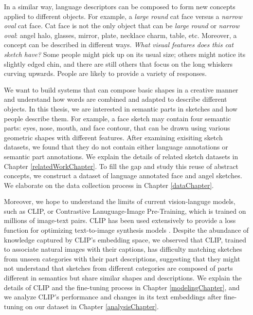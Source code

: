 In a similar way, language descriptors can be composed to form new concepts applied to different objects. For example, a \textit{large round} cat face versus a \textit{narrow oval} cat face. 
Cat face is not the only object that can be \textit{large round} or \textit{narrow oval}: angel halo, glasses, mirror, plate, necklace charm, table, etc.
Moreover, a concept can be described in different ways. \textit{What visual features does this cat sketch have?} Some people might pick up on its usual size; others might notice its slightly edged chin, and there are still others that focus on the long whiskers curving upwards. People are likely to provide a variety of responses.  

We want to build systems that can compose basic shapes in a creative manner and understand how words are combined and adapted to describe different objects.  
In this thesis, we are interested in semantic parts in sketches and how people describe them. For example, a face sketch may contain four semantic parts: eyes, nose, mouth, and face contour, that can be drawn using various geometric shapes with different features. After examining exisiting sketch datasets, we found that they do not contain either language annotations or semantic part annotations. We explain the details of related sketch datasets in Chapter \ref{relatedWorkChapter}. To fill the gap and study this reuse of abstract concepts, we construct a dataset of language annotated face and angel sketches. We elaborate on the data collection process in Chapter \ref{dataChapter}.  

Moreover, we hope to understand the limits of current vision-languge models, such as CLIP, or Contrastive Lanuguage-Image Pre-Training, which is trained on millions of image-text pairs. CLIP has been used extensively to provide a loss function for optimizing text-to-image synthesis models \citep{clipDrawPaper,dalle2Paper,styleganNadaPaper,styleCLIPPaper}. Despite the abundance of knowledge captured by CLIP's embedding space, we observed that CLIP, trained to associate natural images with their captions, has difficulty matching sketches from unseen categories with their part descriptions, suggesting that they might not understand that sketches from different categories are composed of parts different in semantics but share similar shapes and descriptions. We explain the details of CLIP and the fine-tuning process in Chapter \ref{modelingChapter}, and we analyze CLIP's performance and changes in its text embeddings after fine-tuning on our dataset in Chapter \ref{analysisChapter}. 

